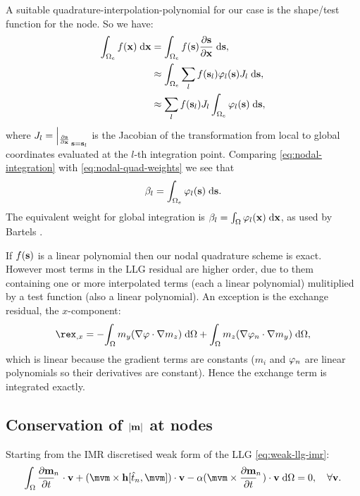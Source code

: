 A suitable quadrature-interpolation-polynomial for our case is the shape/test function for the node.
So we have:
\begin{equation}
\label{eq:nodal-quad-weights}
  \begin{aligned}
    \int_{\Omega_e} f(\mathbf{x}) {\; \text{d}} \mathbf{x} &= \int_{\Omega_e} f({\mathbf{s}}) \frac{\partial {\mathbf{s}}}{\partial \mathbf{x}} {\; \text{d}} {\mathbf{s}}, \\
    &\approx \int_{\Omega_e} \sum_l f({\mathbf{s}}_l) \varphi_l({\mathbf{s}}) J_l {\; \text{d}} {\mathbf{s}}, \\
    &\approx  \sum_l f({\mathbf{s}}_l) J_l \int_{\Omega_e} \varphi_l({\mathbf{s}})  {\; \text{d}} {\mathbf{s}},
  \end{aligned} 
\end{equation}
where $J_l =  {\left|_{\frac{\partial {\mathbf{s}}}{\partial \mathbf{x}}}\right.}_{{\mathbf{s}}={\mathbf{s}}_l}$ is the Jacobian of the transformation from local to global coordinates evaluated at the $l$-th integration point.
Comparing \eqref{eq:nodal-integration} with \eqref{eq:nodal-quad-weights} we see that
\begin{equation}
  \beta_l =  \int_{\Omega_e} \varphi_l({\mathbf{s}})  {\; \text{d}} {\mathbf{s}}.
\end{equation}
The equivalent weight for global integration is $\beta_l = \int_{\Omega} \varphi_l(\mathbf{x}) {\; \text{d}} \mathbf{x}$, as used by Bartels \etal\cite{Bartels2006}.

If $f({\mathbf{s}})$ is a linear polynomial then our nodal quadrature scheme is exact.
However most terms in the LLG residual are higher order, due to them containing one or more interpolated terms (each a linear polynomial) mulitiplied by a test function (also a linear polynomial).
An exception is the exchange residual, \eg the $x$-component:
\begin{equation}
  \begin{aligned}
    \rex_{,x} = - \intd{ m_y \bigb{\grad \tbf \cdot \grad m_z}} + \intd{ m_z \bigb{\grad \tbf_n \cdot \grad m_y}},
  \end{aligned}
\end{equation}
which is linear because the gradient terms are constants ($m_i$ and $\varphi_n$ are linear polynomials so their derivatives are constant).
Hence the exchange term is integrated exactly.



\subsection{Conservation of $\left|{\mathbf{m}} \right|$ at nodes}
\label{sec:weak-cons-absmv}

Starting from the IMR discretised weak form of the LLG \eqref{eq:weak-llg-imr}:
\begin{equation}
  \intd{\dmdtm \cdot \testv + (\mvm \times \hv[\tm, \mvm]) \cdot \testv - \dampc (\mvm \times \dmdtm) \cdot \testv }= 0, \quad \forall \testv .
\end{equation}

